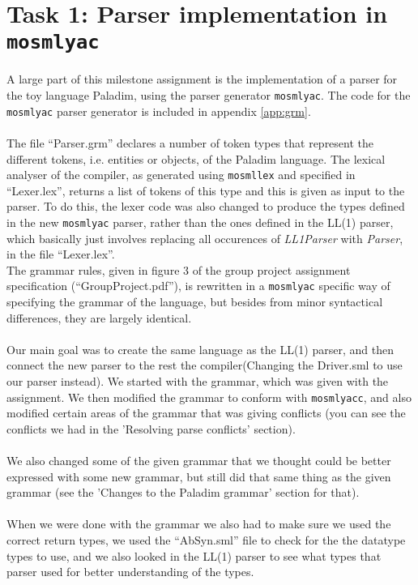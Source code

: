 \section{Task 1: Parser implementation in \texttt{mosmlyac}}
A large part of this milestone assignment is the implementation of a parser for
the toy language \textsf{Paladim}, using the parser generator \texttt{mosmlyac}.
The code for the \texttt{mosmlyac} parser generator is included in appendix
\ref{app:grm}.\\
\\
The file ``Parser.grm'' declares a number of token types that represent the
different tokens, i.e. entities or objects, of the \textsf{Paladim} language.
The lexical analyser of the compiler, as generated using \texttt{mosmllex} and
specified in ``Lexer.lex'', returns a list of tokens of this type and this is
given as input to the parser. To do this, the lexer code was also changed to
produce the types defined in the new \texttt{mosmlyac} parser, rather than the
ones defined in the LL(1) parser, which basically just involves replacing all
occurences of \emph{LL1Parser} with \emph{Parser}, in the file ``Lexer.lex''.\\
The grammar rules, given in figure 3 of the group project assignment
specification (``GroupProject.pdf''), is rewritten in a \texttt{mosmlyac}
specific way of specifying the grammar of the language, but besides from minor
syntactical differences, they are largely identical.\\
\\
Our main goal was to create the same language as the LL(1) parser, and then
connect the new parser to the rest the compiler(Changing the Driver.sml to use
our parser instead). 
We started with the grammar, which was given with the assignment. We then
modified the grammar to conform with \texttt{mosmlyacc}, and also modified
certain areas of the grammar that was giving conflicts (you can see the
conflicts we had in the 'Resolving parse conflicts' section).\\
\\
We also changed some of the given grammar that we thought could be better
expressed with some new grammar, but still did that same thing as the given
grammar (see the 'Changes to the \textsf{Paladim} grammar' section for that).\\
\\
When we were done with the grammar we also had to make sure we used the correct
return types, we used the ``AbSyn.sml'' file to check for the the datatype types
to use, and we also looked in the LL(1) parser to see what types that parser
used for better understanding of the types.


